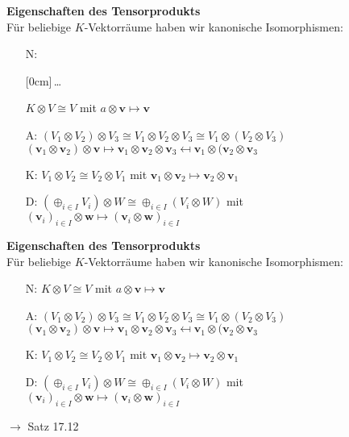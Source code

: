 \documentclass[11pt]{article}
\renewcommand{\cite}[1]{\par\bigskip\hfill{\color{gray}\tiny\(\to\) #1}}
\renewcommand{\vec}[1]{\mathbf{#1}}
\newcommand{\hide}[1]{\parbox{0cm}{\raisebox{-7pt}[0cm]{\dots}}\color{white}#1\color{black}}
\let\olddots\dots
\renewcommand{\dots}{\,\olddots\,}
\newenvironment{field}{}{\newpage}
\newif\ifnote
\newenvironment{note}{\notetrue}{\notefalse}
\newcommand{\localtag}{}
\newcommand{\globaltag}{}
\newcommand{\uuid}{}
\newcommand{\tags}[1]{
    \ifnote
        \renewcommand{\localtag}{#1}
    \else
        \renewcommand{\globaltag}{#1}
    \fi
    }
\newcommand{\xplain}[1]{\renewcommand{\uuid}{#1}}
\begin{document}
\begin{note}
    \tags{Satz}
    \xplain{b8b5eb78-e49d-4b9c-b143-dc99228c4f66}

    \begin{field}
        \textbf{Eigenschaften des Tensorprodukts}\\
        Für beliebige $K$-Vektorräume haben wir kanonische Isomorphismen:
        \begin{itemize}
            \item[N:] \hide{$K\otimes V \cong V$ mit $a\otimes \vec{v} \mapsto \vec{v}$}
            \item[A:] $(V_1\otimes V_2)\otimes V_3 \cong V_1\otimes V_2 \otimes V_3 \cong V_1\otimes (V_2\otimes V_3)$\\
            $(\vec{v}_1\otimes\vec{v}_2)\otimes\vec{v} \mapsto \vec{v}_1\otimes\vec{v}_2\otimes\vec{v}_3 \mapsfrom \vec{v}_1\otimes(\vec{v}_2\otimes\vec{v}_3$
            \item[K:] $V_1\otimes V_2 \cong V_2\otimes V_1$ mit
            $\vec{v}_1\otimes\vec{v}_2 \mapsto \vec{v}_2\otimes\vec{v}_1$
            \item[D:] $(\oplus_{i\in I} V_i)\otimes W \cong \oplus_{i\in I}(V_i\otimes W)$ mit \\
            $(\vec{v}_i)_{i\in I}\otimes \vec{w} \mapsto (\vec{v}_i\otimes \vec{w})_{i\in I}$
        \end{itemize}
    \end{field}
    \begin{field}
        \textbf{Eigenschaften des Tensorprodukts}\\
        Für beliebige $K$-Vektorräume haben wir kanonische Isomorphismen:
        \begin{itemize}
            \item[N:] $K\otimes V \cong V$ mit $a\otimes \vec{v} \mapsto \vec{v}$
            \item[A:] $(V_1\otimes V_2)\otimes V_3 \cong V_1\otimes V_2 \otimes V_3 \cong V_1\otimes (V_2\otimes V_3)$\\
            $(\vec{v}_1\otimes\vec{v}_2)\otimes\vec{v} \mapsto \vec{v}_1\otimes\vec{v}_2\otimes\vec{v}_3 \mapsfrom \vec{v}_1\otimes(\vec{v}_2\otimes\vec{v}_3$
            \item[K:] $V_1\otimes V_2 \cong V_2\otimes V_1$ mit
            $\vec{v}_1\otimes\vec{v}_2 \mapsto \vec{v}_2\otimes\vec{v}_1$
            \item[D:] $(\oplus_{i\in I} V_i)\otimes W \cong \oplus_{i\in I}(V_i\otimes W)$ mit \\
            $(\vec{v}_i)_{i\in I}\otimes \vec{w} \mapsto (\vec{v}_i\otimes \vec{w})_{i\in I}$
        \end{itemize}
        \cite{Satz 17.12}
    \end{field}


\end{note}
\end{document}
